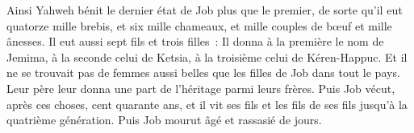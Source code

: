 \begin{multicols}{2}
Ainsi Yahweh bénit le dernier état de Job plus que le premier, de sorte qu'il eut quatorze mille brebis, et six mille chameaux, et mille couples de bœuf et mille ânesses.
Il eut aussi sept fils et trois filles~:
Il donna à la première le nom de Jemima, à la seconde celui de Ketsia, à la troisième celui de Kéren-Happuc.
Et il ne se trouvait pas de femmes aussi belles que les filles de Job dans tout le pays. Leur père leur donna une part de l'héritage parmi leurs frères.
Puis Job vécut, après ces choses, cent quarante ans, et il vit ses fils et les fils de ses fils jusqu'à la quatrième génération.
Puis Job mourut âgé et rassasié de jours.
\PPE{}
\end{multicols}
